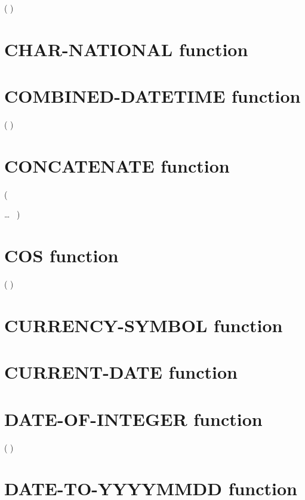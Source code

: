   ( \argument )

\section{CHAR-NATIONAL function}


\section{COMBINED-DATETIME function}

  ( \argument \argument )

\section{CONCATENATE function}

  (
\begin{1=}
  \argument
\end{1=}
\ldots
\ {})

\section{COS function}

  ( \argument )

\section{CURRENCY-SYMBOL function}


\section{CURRENT-DATE function}

 

\section{DATE-OF-INTEGER function}

  ( \argument )

\section{DATE-TO-YYYYMMDD function}

